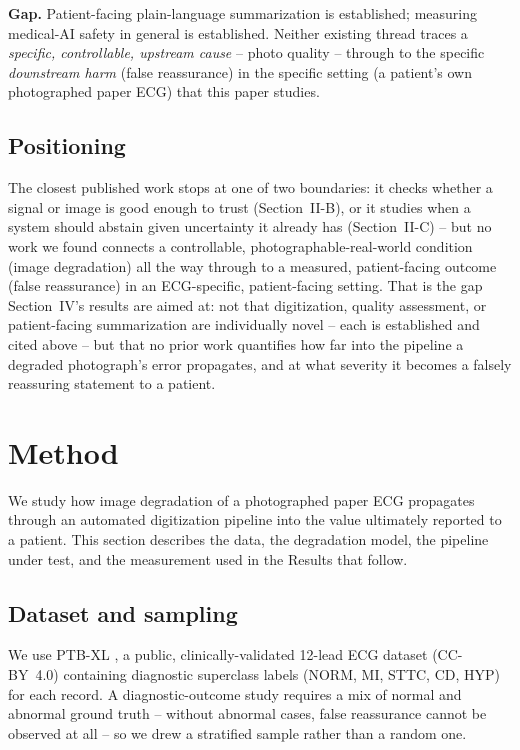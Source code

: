 \documentclass[conference]{IEEEtran}
\begin{document}
\textbf{Gap.} Patient-facing plain-language summarization is established; measuring
medical-AI safety in general is established. Neither existing thread traces a
\emph{specific, controllable, upstream cause} -- photo quality -- through to the
specific \emph{downstream harm} (false reassurance) in the specific setting (a
patient's own photographed paper ECG) that this paper studies.

\subsection{Positioning}

The closest published work stops at one of two boundaries: it checks whether a
signal or image is good enough to trust (Section~II-B), or it studies when a system
should abstain given uncertainty it already has (Section~II-C) -- but no work we
found connects a controllable, photographable-real-world condition (image
degradation) all the way through to a measured, patient-facing outcome (false
reassurance) in an ECG-specific, patient-facing setting. That is the gap Section~IV's
results are aimed at: not that digitization, quality assessment, or patient-facing
summarization are individually novel -- each is established and cited above -- but
that no prior work quantifies how far into the pipeline a degraded photograph's
error propagates, and at what severity it becomes a falsely reassuring statement to a
patient.

\section{Method}

We study how image degradation of a photographed paper ECG propagates through an
automated digitization pipeline into the value ultimately reported to a patient. This
section describes the data, the degradation model, the pipeline under test, and the
measurement used in the Results that follow.

\subsection{Dataset and sampling}

We use PTB-XL \cite{ref45}, a public, clinically-validated 12-lead ECG dataset
(CC-BY~4.0) containing diagnostic superclass labels (NORM, MI, STTC, CD, HYP) for
each record. A diagnostic-outcome study requires a mix of normal and abnormal ground
truth -- without abnormal cases, false reassurance cannot be observed at all -- so we
drew a stratified sample rather than a random one.
\end{document}
